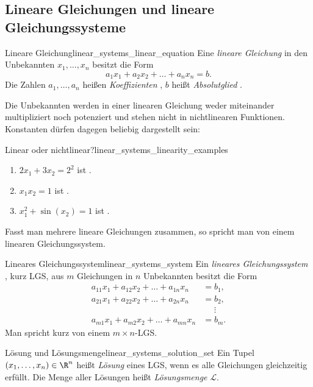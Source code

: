 \subsection{Lineare Gleichungen und lineare Gleichungssysteme}
\label{subsec:linear_systems_motivation_and_definition}

\begin{DefinitionBox}{Lineare Gleichung}{linear_systems_linear_equation}
  Eine \emph{lineare Gleichung}  in den
  Unbekannten $x_1,\dots,x_n$ besitzt die Form
  \[
    a_1x_1+a_2x_2+\dots+a_nx_n=b.
  \]
  Die Zahlen $a_1,\dots,a_n$ heißen \emph{Koeffizienten}
  , $b$ heißt \emph{Absolutglied}
  .
\end{DefinitionBox}

Die Unbekannten werden in einer linearen Gleichung weder miteinander
multipliziert noch potenziert und stehen nicht in nichtlinearen Funktionen.
Konstanten dürfen dagegen beliebig dargestellt sein:

\begin{ExampleBox}{Linear oder nichtlinear?}{linear_systems_linearity_examples}
  \begin{enumerate}[label=\alph*),itemsep=0.6em]
    \item $2x_1+3x_2=2^2$ ist .
    \item $x_1x_2=1$ ist .
    \item $x_1^2+\sin(x_2)=1$ ist .
  \end{enumerate}
\end{ExampleBox}

Fasst man mehrere lineare Gleichungen zusammen, so spricht man von einem
linearen Gleichungssystem.
\begin{DefinitionBox}{Lineares Gleichungssystem}{linear_systems_system}
  Ein \emph{lineares Gleichungssystem} ,
  kurz LGS, aus $m$ Gleichungen in $n$ Unbekannten besitzt die Form
  \[
    \begin{aligned}
      a_{11}x_1+a_{12}x_2+\dots+a_{1n}x_n&=b_1,\\
      a_{21}x_1+a_{22}x_2+\dots+a_{2n}x_n&=b_2,\\
      &\mathrel{\phantom{=}}\vdots\\
      a_{m1}x_1+a_{m2}x_2+\dots+a_{mn}x_n&=b_m.
    \end{aligned}
  \]
  Man spricht kurz von einem $m\times n$-LGS.
\end{DefinitionBox}

\begin{DefinitionBox}{Lösung und Lösungsmenge}{linear_systems_solution_set}
  Ein Tupel $(x_1,\dots,x_n)\in\R^n$ heißt \emph{Lösung}
   eines LGS, wenn es alle Gleichungen gleichzeitig
  erfüllt. Die Menge aller Lösungen heißt \emph{Lösungsmenge}
   $\mathcal{L}$.
\end{DefinitionBox}
